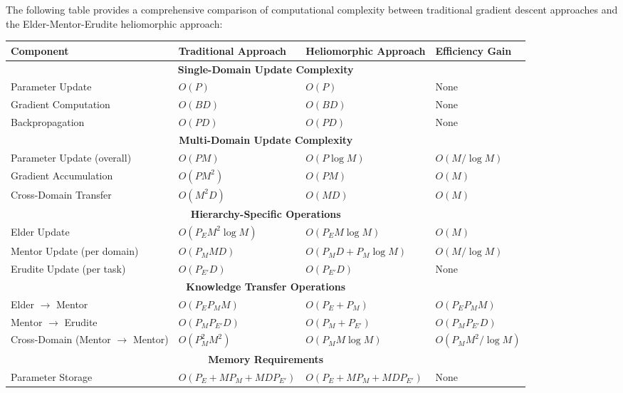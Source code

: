 The following table provides a comprehensive comparison of computational complexity between traditional gradient descent approaches and the Elder-Mentor-Erudite heliomorphic approach:

\begin{table}[h]
\centering
\begin{tabular}{|p{3cm}|p{4.5cm}|p{4.5cm}|p{3cm}|}
\hline
\textbf{Component} & \textbf{Traditional Approach} & \textbf{Heliomorphic Approach} & \textbf{Efficiency Gain} \\
\hline
\multicolumn{4}{|c|}{\textbf{Single-Domain Update Complexity}} \\
\hline
Parameter Update & $O(P)$ & $O(P)$ & None \\
\hline
Gradient Computation & $O(BD)$ & $O(BD)$ & None \\
\hline
Backpropagation & $O(PD)$ & $O(PD)$ & None \\
\hline
\multicolumn{4}{|c|}{\textbf{Multi-Domain Update Complexity}} \\
\hline
Parameter Update (overall) & $O(PM)$ & $O(P \log M)$ & $O(M/\log M)$ \\
\hline
Gradient Accumulation & $O(PM^2)$ & $O(PM)$ & $O(M)$ \\
\hline
Cross-Domain Transfer & $O(M^2D)$ & $O(MD)$ & $O(M)$ \\
\hline
\multicolumn{4}{|c|}{\textbf{Hierarchy-Specific Operations}} \\
\hline
Elder Update & $O(P_E M^2 \log M)$ & $O(P_E M \log M)$ & $O(M)$ \\
\hline
Mentor Update (per domain) & $O(P_M M D)$ & $O(P_M D + P_M \log M)$ & $O(M/\log M)$ \\
\hline
Erudite Update (per task) & $O(P_{E'} D)$ & $O(P_{E'} D)$ & None \\
\hline
\multicolumn{4}{|c|}{\textbf{Knowledge Transfer Operations}} \\
\hline
Elder $\to$ Mentor & $O(P_E P_M M)$ & $O(P_E + P_M)$ & $O(P_E P_M M)$ \\
\hline
Mentor $\to$ Erudite & $O(P_M P_{E'} D)$ & $O(P_M + P_{E'})$ & $O(P_M P_{E'} D)$ \\
\hline
Cross-Domain (Mentor $\to$ Mentor) & $O(P_M^2 M^2)$ & $O(P_M M \log M)$ & $O(P_M M^2/\log M)$ \\
\hline
\multicolumn{4}{|c|}{\textbf{Memory Requirements}} \\
\hline
Parameter Storage & $O(P_E + MP_M + MD P_{E'})$ & $O(P_E + MP_M + MD P_{E'})$ & None \\
\hline

\end{tabular}
\end{table}
